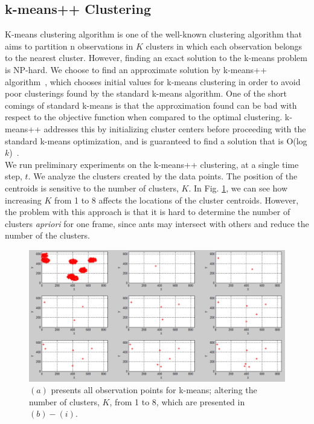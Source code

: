 \documentclass[12pt]{article}
\begin{document}
\subsection{k-means++ Clustering}
K-means clustering algorithm is one of the well-known clustering algorithm that aims to partition n observations in $K$ clusters in which each observation belongs to the nearest cluster. However, finding an exact solution to the k-means problem is NP-hard. We choose to find an approximate solution by k-means++ algorithm~\cite{arthur2007k}, which chooses initial values for k-means clustering in order to avoid poor clusterings found by the standard k-means algorithm. One of the short comings of standard k-means is that the approximation found can be bad with respect to the objective function when compared to the optimal clustering.  k-means++ addresses this by initializing cluster centers before proceeding with the standard k-means optimization, and is guaranteed to find a solution that is O(log $k$)~\cite{arthur2007k}.\\
We run preliminary experiments on the k-means++ clustering, at a single time step, $t$. We analyze the clusters created by the data points. The position of the centroids is sensitive to the number of clusters, $K$. In Fig. \ref{fig:plusCluster}, we can see how increasing $K$ from 1 to 8 affects the locations of the cluster centroids. However, the problem with this approach is that it is hard to determine the number of clusters {\it apriori} for one frame, since ants may intersect with others and reduce the number of the clusters. 

\begin{figure}[h!]
\centering
\includegraphics[width=5in]{GDataPlot11.png}
\caption{$(a)$ presents all observation points for k-means; altering the number of clusters, $K$, from 1 to 8, which are presented in $(b)-(i)$.}
\label{fig:plusCluster}
\end{figure}
\end{document}
